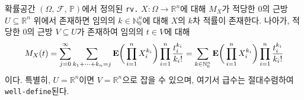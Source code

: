 \begin{theorem}\label{thm:MGFTaylor}
    확률공간 $(\Omega,\,\mathcal{F},\,\mathbb{P})$에서 정의된 \texttt{rv.} $X:\Omega\to\mathbb{R}^n$에 대해 $M_X$가 적당한 $0$의 근방 $U\subseteq\mathbb{R}^n$ 위에서 존재하면 임의의 $k\in\mathbb{N}_0^n$에 대해 $X$의 $k$차 적률이 존재한다. 나아가, 적당한 $0$의 근방 $V\subseteq U$가 존재하여 임의의 $t\in V$에 대해 
    \begin{equation*}
        M_X(t)=\sum_{j=0}^\infty\sum_{k_1+\cdots+k_n=j}\mathbf{E}\bigg(\prod_{i=1}^nX_i^{k_i}\bigg)\prod_{i=1}^n\frac{t_i^{k_i}}{k_i!}=\sum_{k\in\mathbb{N}_0^n}\mathbf{E}\bigg(\prod_{i=1}^nX_i^{k_i}\bigg)\prod_{i=1}^n\frac{t_i^{k_i}}{k_i!}
    \end{equation*}
    이다. 특별히, $U=\mathbb{R}^n$이면 $V=\mathbb{R}^n$으로 잡을 수 있으며, 여기서 급수는 절대수렴하여 \texttt{well-define}된다.
\end{theorem}

